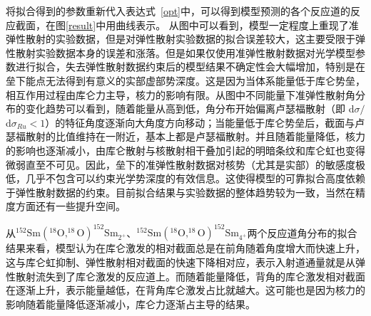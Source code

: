 \documentclass{npr}
\begin{document}
将拟合得到的参数重新代入表达式~\eqref{opt}中，可以得到模型预测的各个反应道的反应截面，在图\ref{result}中用曲线表示。
从图中可以看到，模型一定程度上重现了准弹性散射的实验数据，但是对弹性散射实验数据的拟合误差较大，这主要受限于弹性散射实验数据本身的误差和涨落。但是如果仅使用准弹性散射数据对光学模型参数进行拟合，失去弹性散射数据约束后的模型结果不确定性会大幅增加，特别是在垒下能点无法得到有意义的实部虚部势深度。这是因为当体系能量低于库仑势垒，相互作用过程由库仑力主导，核力的影响有限。从图中不同能量下准弹性散射角分布的变化趋势可以看到，随着能量从高到低，角分布开始偏离卢瑟福散射（即 d$\sigma / $d$\sigma_{Ru} < 1$）的特征角度逐渐向大角度方向移动；当能量低于库仑势垒后，截面与卢瑟福散射的比值维持在一附近，基本上都是卢瑟福散射。并且随着能量降低，核力的影响也逐渐减小，由库仑散射与核散射相干叠加引起的明暗条纹和库仑虹也变得微弱直至不可见。因此，垒下的准弹性散射数据对核势（尤其是实部）的敏感度极低，几乎不包含可以约束光学势深度的有效信息。这使得模型的可靠拟合高度依赖于弹性散射数据的约束。目前拟合结果与实验数据的整体趋势较为一致，当然在精度方面还有一些提升空间。

从$^{152}\mathrm{Sm}(^{18}\mathrm{O},^{18}\mathrm{O})^{152}\mathrm{Sm}_{2^+}$、$^{152}\mathrm{Sm}(^{18}\mathrm{O},^{18}\mathrm{O})^{152}\mathrm{Sm}_{4^+}$两个反应道角分布的拟合结果来看，模型认为在库仑激发的相对截面总是在前角随着角度增大而快速上升，这与库仑虹抑制、弹性散射相对截面的快速下降相对应，表示入射道通量就是从弹性散射流失到了库仑激发的反应道上。而随着能量降低，背角的库仑激发相对截面在逐渐上升，表示能量越低，在背角库仑激发占比就越大。这可能也是因为核力的影响随着能量降低逐渐减小，库仑力逐渐占主导的结果。
\end{document}
